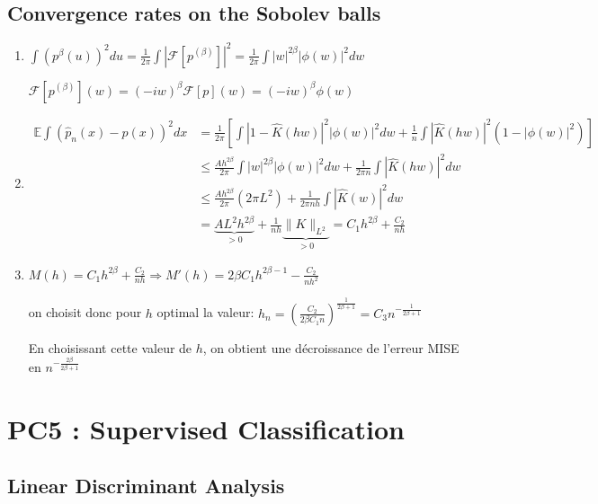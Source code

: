 \documentclass[10pt,a4paper,oneside]{article}
\begin{document}
\subsection{Convergence rates on the Sobolev balls}

\begin{enumerate}
\item
$\int (p^{\beta}(u))^2 du = \frac{1}{2\pi} \int | \mathcal{F}[p^{(\beta)}] |^2 = \frac{1}{2\pi} \int |w|^{2\beta} |\phi(w)|^2 dw$

$\mathcal{F}[p^{(\beta)}](w) = (-iw)^\beta \mathcal{F}[p](w) = (-iw)^\beta \phi(w)$

\item
\begin{align*}
\mathbb{E} \int (\hat{p}_n(x) - p(x))^2 dx &= \frac{1}{2\pi} [\int |1 - \hat{K}(hw)|^2 |\phi(w)|^2 dw + \frac{1}{n} \int |\hat{K}(hw)|^2 (1 - |\phi(w)|^2) ] \\
&\leq \frac{Ah^{2\beta}}{2\pi} \int |w|^{2\beta} |\phi(w)|^2 dw + \frac{1}{2 \pi n} \int |\hat{K}(hw)|^2 dw \\
&\leq \frac{Ah^{2\beta}}{2\pi} (2\pi L^2) + \frac{1}{2\pi n h} \int |\hat{K}(w)|^2 dw \\
&= \underbrace{AL^2 h^{2\beta}}_{>0} + \frac{1}{nh} \underbrace{\| K \|_{L^2}}_{>0} = C_1 h^{2\beta} + \frac{C_2}{nh}
\end{align*}

\item
$M(h) = C_1 h^{2\beta} + \frac{C_2}{nh} \Rightarrow M'(h) = 2\beta C_1 h^{2\beta - 1} - \frac{C_2}{nh^2}$

on choisit donc pour $h$ optimal la valeur: $h_n = (\frac{C_2}{2\beta C_1 n}) ^ {\frac{1}{2\beta + 1}} = C_3 n^{-\frac{1}{2\beta + 1}}$

En choisissant cette valeur de $h$, on obtient une décroissance de l'erreur MISE en $n^{-\frac{2\beta}{2\beta + 1}}$
\end{enumerate}

\newpage
\section{PC5 : Supervised Classification}

\subsection{Linear Discriminant Analysis}
\end{document}
